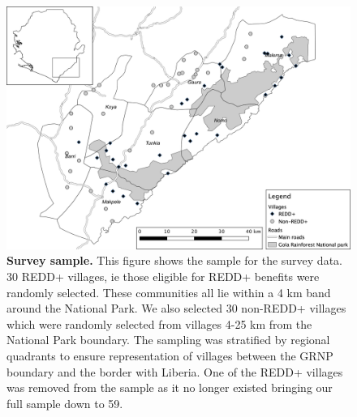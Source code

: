 \documentclass[
]{article}
\begin{document}
\begin{figure}[H]

{\centering \includegraphics[width=0.9\linewidth]{3_maps/REDD_Map_greyscale} 

}

\caption{\textbf{Survey sample.} This figure shows the sample for the survey data. 30 REDD+ villages, ie those eligible for REDD+ benefits were randomly selected. These communities all lie within a 4 km band around the National Park. We also selected 30 non-REDD+ villages which were randomly selected from villages 4-25 km from the National Park boundary. The sampling was stratified by regional quadrants to ensure representation of villages between the GRNP boundary and the border with Liberia. One of the REDD+ villages was removed from the sample as it no longer existed bringing our full sample down to 59.}\label{fig:figSample}
\end{figure}
\end{document}
